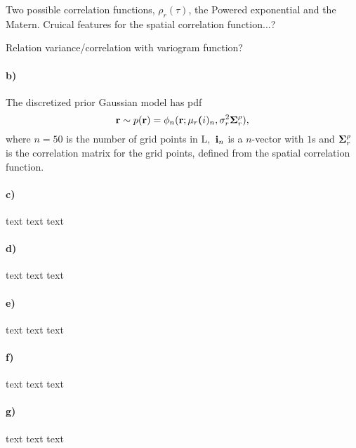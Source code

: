 Two possible correlation functions, $\rho_r(\tau)$, the Powered exponential and the Matern. Cruical features for the spatial correlation function...?

Relation variance/correlation with variogram function?

\paragraph{b)}
The discretized prior Gaussian model has pdf
\begin{equation}
    \boldsymbol{\mathbf{r}} \sim p(\boldsymbol{\mathbf{r}}) = \phi_n(\boldsymbol{\mathbf{r}}; \mu_r \boldsymbol{\mathbf{(}}i)_n, \sigma_r^2\boldsymbol{\mathbf{\Sigma}}_r^{\rho}),
\end{equation}
where $n = 50$ is the number of grid points in $\text{L},$ $\boldsymbol{\mathbf{i}}_n$ is a $n$-vector with $1$s and $\boldsymbol{\mathbf{\Sigma}}_r^{\rho}$ is the correlation matrix for the grid points, defined from the spatial correlation function.

\paragraph{c)}
text text text

\paragraph{d)}
text text text

\paragraph{e)}
text text text

\paragraph{f)}
text text text

\paragraph{g)}
text text text
